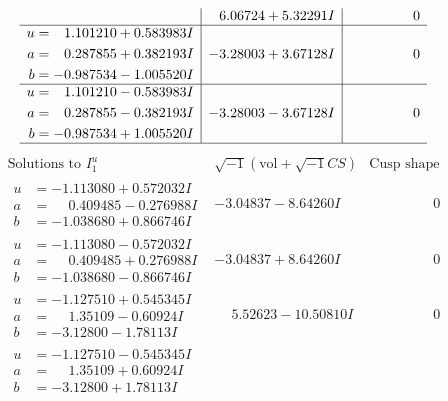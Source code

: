 \documentclass[1p]{elsarticle_modified}
\theoremstyle{definition}
\newcommand{\I}{\sqrt{-1}}
\begin{document}
$$\begin{array}{c|c|c}
 & \phantom{-}6.06724 + 5.32291 I & \phantom{-0.000000 } 0 \\ \hline\begin{aligned}
u &= \phantom{-}1.101210 + 0.583983 I \\
a &= \phantom{-}0.287855 + 0.382193 I \\
b &= -0.987534 - 1.005520 I\end{aligned}
 & -3.28003 + 3.67128 I & \phantom{-0.000000 } 0 \\ \hline\begin{aligned}
u &= \phantom{-}1.101210 - 0.583983 I \\
a &= \phantom{-}0.287855 - 0.382193 I \\
b &= -0.987534 + 1.005520 I\end{aligned}
 & -3.28003 - 3.67128 I & \phantom{-0.000000 } 0\\
 \hline 
 \end{array}$$\newpage$$\begin{array}{c|c|c}  
\text{Solutions to }I^u_{1}& \I (\text{vol} + \sqrt{-1}CS) & \text{Cusp shape}\\
 \hline 
\begin{aligned}
u &= -1.113080 + 0.572032 I \\
a &= \phantom{-}0.409485 - 0.276988 I \\
b &= -1.038680 + 0.866746 I\end{aligned}
 & -3.04837 - 8.64260 I & \phantom{-0.000000 } 0 \\ \hline\begin{aligned}
u &= -1.113080 - 0.572032 I \\
a &= \phantom{-}0.409485 + 0.276988 I \\
b &= -1.038680 - 0.866746 I\end{aligned}
 & -3.04837 + 8.64260 I & \phantom{-0.000000 } 0 \\ \hline\begin{aligned}
u &= -1.127510 + 0.545345 I \\
a &= \phantom{-}1.35109 - 0.60924 I \\
b &= -3.12800 - 1.78113 I\end{aligned}
 & \phantom{-}5.52623 - 10.50810 I & \phantom{-0.000000 } 0 \\ \hline\begin{aligned}
u &= -1.127510 - 0.545345 I \\
a &= \phantom{-}1.35109 + 0.60924 I \\
b &= -3.12800 + 1.78113 I\end{aligned}

\end{array}$$
\end{document}
